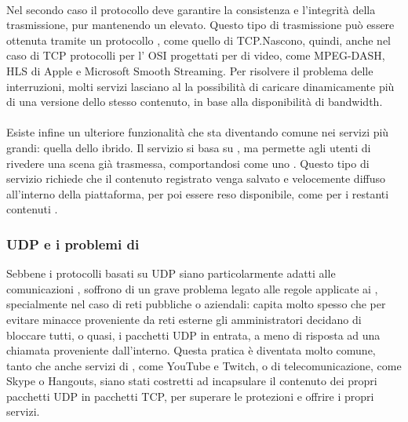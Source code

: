 			\paragraph*{}
			Nel secondo caso il protocollo deve garantire la consistenza e l'integrità della trasmissione, pur mantenendo un  elevato. Questo tipo di trasmissione può essere ottenuta tramite un protocollo , come quello di \gls{TCP}.\@ Nascono, quindi, anche nel caso di TCP protocolli per l' \gls{OSI} progettati per  di video, come \gls{MPEG-DASH}, \gls{HLS} di Apple e Microsoft Smooth Streaming. Per risolvere il problema delle interruzioni, molti servizi lasciano al  la possibilità di caricare dinamicamente più di una versione dello stesso contenuto, in base alla disponibilità di bandwidth.
			\paragraph*{}
			Esiste infine un ulteriore funzionalità che sta diventando comune nei servizi più grandi: quella dello  ibrido. Il servizio si basa su  , ma permette agli utenti di rivedere una scena già trasmessa, comportandosi come uno  . Questo tipo di servizio richiede che il contenuto registrato venga salvato e velocemente diffuso all'interno della piattaforma, per poi essere reso disponibile, come per i restanti contenuti .

		\subsubsection{UDP e i problemi di }
			Sebbene i protocolli basati su \gls{UDP} siano particolarmente adatti alle comunicazioni , soffrono di un grave problema legato alle regole applicate ai , specialmente nel caso di reti pubbliche o aziendali: capita molto spesso che per evitare minacce proveniente da reti esterne gli amministratori decidano di bloccare tutti, o quasi, i pacchetti UDP in entrata, a meno di risposta ad una chiamata proveniente dall'interno. Questa pratica è diventata molto comune, tanto che anche servizi di , come YouTube e Twitch, o di telecomunicazione, come Skype o Hangouts, siano stati costretti ad incapsulare il contenuto dei propri pacchetti \gls{UDP} in pacchetti \gls{TCP}, per superare le protezioni e offrire i propri servizi.

